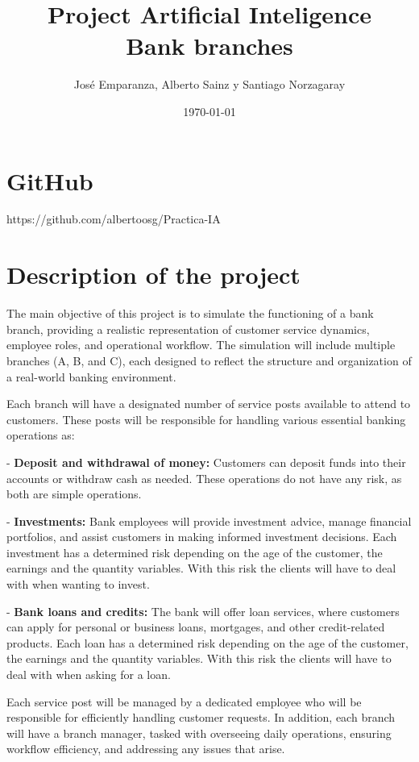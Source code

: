 \documentclass[titlepage, 12pt]{article}
\title{\textbf{Project Artificial Inteligence \\ Bank branches}}
\author{José Emparanza, Alberto Sainz y Santiago Norzagaray}
\date{\today}
\begin{document}
\maketitle

\tableofcontents

\newpage

\section{GitHub}
https://github.com/albertoosg/Practica-IA

\section{Description of the project}
The main objective of this project is to simulate the functioning of a bank branch, providing a realistic representation of customer service dynamics, employee roles, and operational workflow. The simulation will include multiple branches (A, B, and C), each designed to reflect the structure and organization of a real-world banking environment.

Each branch will have a designated number of service posts available to attend to customers. These posts will be responsible for handling various essential banking operations as:

- \textbf{Deposit and withdrawal of money:} Customers can deposit funds into their accounts or withdraw cash as needed. These operations do not have any risk, as both are simple operations.

- \textbf{Investments:} Bank employees will provide investment advice, manage financial portfolios, and assist customers in making informed investment decisions. Each investment has a determined risk depending on the age of the customer, the earnings and the quantity variables. With this risk the clients will have to deal with when wanting to invest. 

- \textbf{Bank loans and credits:} The bank will offer loan services, where customers can apply for personal or business loans, mortgages, and other credit-related products. Each loan has a determined risk depending on the age of the customer, the earnings and the quantity variables. With this risk the clients will have to deal with when asking for a loan. 

Each service post will be managed by a dedicated employee who will be responsible for efficiently handling customer requests. In addition, each branch will have a branch manager, tasked with overseeing daily operations, ensuring workflow efficiency, and addressing any issues that arise. 
\end{document}
